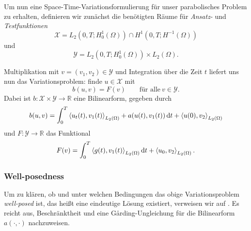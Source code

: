 Um nun eine Space-Time-Variationsformulierung für unser parabolisches Problem zu erhalten, definieren wir zunächst die benötigten Räume für \emph{Ansatz-} und \emph{Testfunktionen}
\begin{equation}
    \mathcal X = L_{2}(0, T; H^{1}_{0}(\Omega)) \cap H^{1}(0, T; H^{-1}(\Omega))
\end{equation}
und
\begin{equation}
    \mathcal Y = L_{2}(0, T; H^{1}_{0}(\Omega)) \times L_{2}(\Omega).
\end{equation}

Multiplikation mit $v = (v_{1}, v_{2}) \in \mathcal Y$ und Integration über die Zeit $t$ liefert uns nun das Variationsproblem: finde $u \in \mathcal X$ mit
\begin{equation}
     b(u, v) = F(v) \qquad \text{für alle}~v \in \mathcal Y.
\end{equation}
Dabei ist $b \colon \mathcal X \times \mathcal Y \to \mathbb{R}$ eine Bilinearform, gegeben durch
\begin{equation}
    b(u, v) = \int_{0}^{T} \left\langle u_{t}(t),v_{1}(t)\right\rangle_{L_{2}(\Omega)} + a(u(t), v_{1}(t)) \mathop{}\!\mathrm{d} t + \left\langle u(0),v_{2}\right\rangle_{L_{2}(\Omega)}
\end{equation}
und $F \colon \mathcal Y \to \mathbb{R}$ das Funktional
\begin{equation}
    F(v) = \int_{0}^{T} \left\langle g(t),v_{1}(t)\right\rangle_{L_{2}(\Omega)} \mathop{}\!\mathrm{d} t + \left\langle u_{0},v_{2}\right\rangle_{L_{2}(\Omega)}.
\end{equation}


\subsubsection{Well-posedness} %
\label{ssub:well_posedness}
Um zu klären, ob und unter welchen Bedingungen das obige Variationsproblem \emph{well-posed} ist, das heißt eine eindeutige Lösung existiert, verweisen wir auf \cite{Schwab:2009ec}.
Es reicht aus, Beschränktheit und eine G\aa{}rding-Ungleichung für die Bilinearform $a(\cdot, \cdot)$ nachzuweisen.


